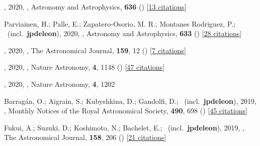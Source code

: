 \item[{\color{numcolor}\scriptsize24}] , 2020, , Astronomy and Astrophysics, \textbf{636} () [\href{https://ui.adsabs.harvard.edu/abs/2020A&A...636A..89H}{13 citations}]

\item[{\color{numcolor}\scriptsize23}] Parviainen, H.; Palle, E.; Zapatero-Osorio, M. R.; Montanes Rodriguez, P.; \etal\ (incl.\ \textbf{jpdeleon}), 2020, , Astronomy and Astrophysics, \textbf{633} () [\href{https://ui.adsabs.harvard.edu/abs/2020A&A...633A..28P}{28 citations}]

\item[{\color{numcolor}\scriptsize22}] , 2020, , The Astronomical Journal, \textbf{159}, 12 () [\href{https://ui.adsabs.harvard.edu/abs/2020AJ....159...12M}{7 citations}]

\item[{\color{numcolor}\scriptsize21}] , 2020, , Nature Astronomy, \textbf{4}, 1148 () [\href{https://ui.adsabs.harvard.edu/abs/2020NatAs...4.1148J}{47 citations}]

\item[{\color{numcolor}\scriptsize20}] , 2020, , Nature Astronomy, \textbf{4}, 1202

\item[{\color{numcolor}\scriptsize19}] Barrag{\'a}n, O.; Aigrain, S.; Kubyshkina, D.; Gandolfi, D.; \etal\ (incl.\ \textbf{jpdeleon}), 2019, , Monthly Notices of the Royal Astronomical Society, \textbf{490}, 698 () [\href{https://ui.adsabs.harvard.edu/abs/2019MNRAS.490..698B}{45 citations}]

\item[{\color{numcolor}\scriptsize18}] Fukui, A.; Suzuki, D.; Koshimoto, N.; Bachelet, E.; \etal\ (incl.\ \textbf{jpdeleon}), 2019, , The Astronomical Journal, \textbf{158}, 206 () [\href{https://ui.adsabs.harvard.edu/abs/2019AJ....158..206F}{21 citations}]

